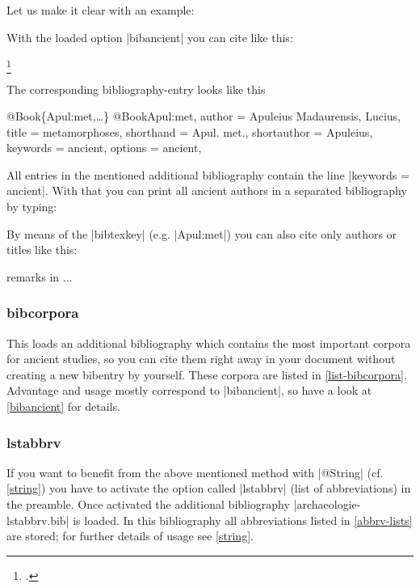 \documentclass[a4paper,
10pt,
greek,
french,
spanish,
italian,
ngerman,
english
]{ltxdoc}
\begin{document}
Let us make it clear with an example:

With the loaded option |bibancient| you can cite like this:  


\begin{example}
\footnote{\cite[3,2,5--7]{Apul:met}.}
\end{example}


The corresponding bibliography-entry looks like this
\begin{bibexample}[label=Apul:met]{{@}Book\{Apul:met,…\}}
@Book{Apul:met,
  author      = {Apuleius Madaurensis, Lucius},
  title       = {metamorphoses},
  shorthand   = {Apul. met.},
  shortauthor = {Apuleius},
  keywords    = {ancient},
  options     = {ancient},
}
\end{bibexample}
All entries in the mentioned additional bibliography contain the line |keywords = {ancient}|.
With that you can print all ancient authors in a separated bibliography by typing:
\begin{code}
\printbibliography[keyword=ancient]
\end{code}

\begin{refsection}
By means of the |bibtexkey| (e.g. |Apul:met|) you can also cite only authors or titles like this: 


\begin{example}
\citeauthor{Apul:met} remarks in  ...
\end{example}

\end{refsection}



\subsubsection{bibcorpora}\label{bibcorpora}
This loads an additional bibliography which contains the most important corpora for ancient studies, so you can cite them right away in your document without creating a new bibentry by yourself. 
These corpora are listed in \cref{list-bibcorpora}. 
Advantage and usage mostly correspond to |bibancient|, 
so have a look at \cref{bibancient} for details.



\subsubsection{lstabbrv}\label{abbrv}
If you want to benefit from the above mentioned method with |@String| (cf. \cref{string}) 
you have to activate the option called |lstabbrv| (list of abbreviations) in the preamble.
Once activated the additional bibliography |archaeologie-lstabbrv.bib| is loaded. 
In this bibliography all abbreviations listed in \cref{abbrv-lists} are stored; 
for further details of usage see \cref{string}.
\end{document}
